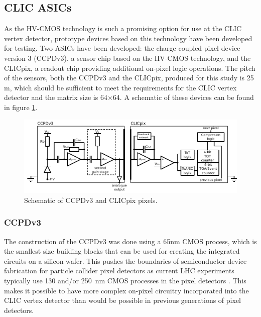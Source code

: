
\subsection{CLIC ASICs}
As the HV-CMOS technology is such a promising option for use at the CLIC vertex detector, prototype devices based on this technology have been developed for testing.  Two ASICs have been developed: the charge coupled pixel device version 3 (CCPDv3), a sensor chip based on the HV-CMOS technology, and the CLICpix, a readout chip providing additional on-pixel logic operations.  The pitch of the sensors, both the CCPDv3 and the CLICpix, produced for this study is 25 {\mu}m, which should be sufficient to meet the requirements for the CLIC vertex detector and the matrix size is 64$\times$64.  A schematic of these devices can be found in figure \ref{fig:ccpdandclicpix}.
 
\begin{figure}[h!]
\centering
\includegraphics[width=1.0\textwidth]{CLICdpVertex/Plots/schematic.pdf}
\caption[Schematic of CCPDv3 and CLICpix pixels.]{Schematic of CCPDv3 and CLICpix pixels.}
\label{fig:ccpdandclicpix}
\end{figure}


\subsubsection{CCPDv3}

The construction of the CCPDv3 was done using a 65nm CMOS process, which is the smallest size building blocks that can be used for creating the integrated circuits on a silicon wafer.  This pushes the boundaries of semiconductor device fabrication for particle collider pixel detectors as current LHC experiments typically use 130 and/or 250~nm CMOS processes in the pixel detectors \cite{Aaij:2244311, Dominguez:1481838}.  This makes it possible to have more complex on-pixel circuitry incorporated into the CLIC vertex detector than would be possible in previous generations of pixel detectors.  

